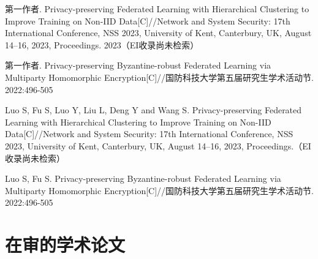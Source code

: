 \begin{resume}
\begin{enumerate}[label={[\arabic*]},itemsep=0pt,parsep=0pt,labelindent=26pt,labelwidth=*,leftmargin=0pt,itemindent=*,align=left]
	
	\ifisanon
		\item 第一作者. Privacy-preserving Federated Learning with Hierarchical Clustering to Improve Training on Non-IID Data[C]//Network and System Security: 17th International Conference, NSS 2023, University of Kent, Canterbury, UK, August 14--16, 2023, Proceedings. 2023（EI收录尚未检索）
		
		\item 第一作者. Privacy-preserving Byzantine-robust Federated Learning via Multiparty Homomorphic Encryption[C]//国防科技大学第五届研究生学术活动节. 2022:496-505
	\else
		\item Luo S, Fu S, Luo Y, Liu L, Deng Y and Wang S. Privacy-preserving Federated Learning with Hierarchical Clustering to Improve Training on Non-IID Data[C]//Network and System Security: 17th International Conference, NSS 2023, University of Kent, Canterbury, UK, August 14--16, 2023, Proceedings.（EI收录尚未检索）
		
		\item Luo S, Fu S. Privacy-preserving Byzantine-robust Federated Learning via Multiparty Homomorphic Encryption[C]//国防科技大学第五届研究生学术活动节. 2022:496-505
	\fi
	
	
\end{enumerate}

  \section*{在审的学术论文} %

\begin{enumerate}[label={[\arabic*]},itemsep=0pt,parsep=0pt,labelindent=26pt,labelwidth=*,leftmargin=0pt,itemindent=*,align=left]
	
	

\end{enumerate}
\end{resume}
